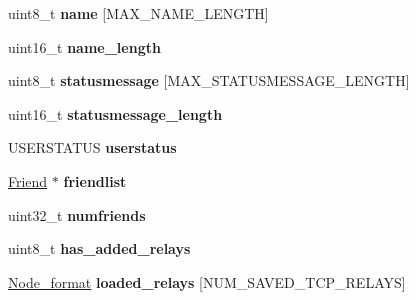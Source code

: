 \begin{DoxyCompactItemize}
\item 
\hypertarget{struct_messenger_a11b8cc6595eea79e65c978209278e683}{uint8\+\_\+t {\bfseries name} \mbox{[}M\+A\+X\+\_\+\+N\+A\+M\+E\+\_\+\+L\+E\+N\+G\+T\+H\mbox{]}}\label{struct_messenger_a11b8cc6595eea79e65c978209278e683}

\item 
\hypertarget{struct_messenger_a3573d7a906b26e9999cd74f2c4066601}{uint16\+\_\+t {\bfseries name\+\_\+length}}\label{struct_messenger_a3573d7a906b26e9999cd74f2c4066601}

\item 
\hypertarget{struct_messenger_a8f12612ac1191135a1a5b1cbcbc82852}{uint8\+\_\+t {\bfseries statusmessage} \mbox{[}M\+A\+X\+\_\+\+S\+T\+A\+T\+U\+S\+M\+E\+S\+S\+A\+G\+E\+\_\+\+L\+E\+N\+G\+T\+H\mbox{]}}\label{struct_messenger_a8f12612ac1191135a1a5b1cbcbc82852}

\item 
\hypertarget{struct_messenger_a43fe9dde52dc12e90933150eca91c0c3}{uint16\+\_\+t {\bfseries statusmessage\+\_\+length}}\label{struct_messenger_a43fe9dde52dc12e90933150eca91c0c3}

\item 
\hypertarget{struct_messenger_adde524f5a15465585cbc2543cd0b2710}{U\+S\+E\+R\+S\+T\+A\+T\+U\+S {\bfseries userstatus}}\label{struct_messenger_adde524f5a15465585cbc2543cd0b2710}

\item 
\hypertarget{struct_messenger_a42c185c16c5df7707ba4d70bb6ee75e7}{\hyperlink{struct_friend}{Friend} $\ast$ {\bfseries friendlist}}\label{struct_messenger_a42c185c16c5df7707ba4d70bb6ee75e7}

\item 
\hypertarget{struct_messenger_a476f4b36bd078632dd434e76df29d922}{uint32\+\_\+t {\bfseries numfriends}}\label{struct_messenger_a476f4b36bd078632dd434e76df29d922}

\item 
\hypertarget{struct_messenger_af97bc78d4a1b6b87167a479a1cb9920c}{uint8\+\_\+t {\bfseries has\+\_\+added\+\_\+relays}}\label{struct_messenger_af97bc78d4a1b6b87167a479a1cb9920c}

\item 
\hypertarget{struct_messenger_a75d4e8cfc84896f1684dd7c62c1be397}{\hyperlink{struct_node__format}{Node\+\_\+format} {\bfseries loaded\+\_\+relays} \mbox{[}N\+U\+M\+\_\+\+S\+A\+V\+E\+D\+\_\+\+T\+C\+P\+\_\+\+R\+E\+L\+A\+Y\+S\mbox{]}}\label{struct_messenger_a75d4e8cfc84896f1684dd7c62c1be397}


\end{DoxyCompactItemize}
